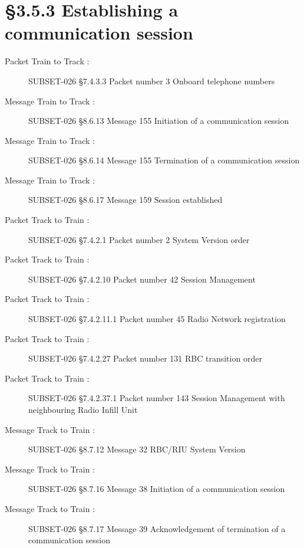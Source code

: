 \documentclass{template/openetcs_report}
\begin{document}
\section{\S3.5.3 Establishing a communication session}
\begin{description}
\item [Packet Train to Track :] SUBSET-026 \S7.4.3.3 Packet number 3	Onboard telephone numbers
\item [Message Train to Track :] SUBSET-026 \S8.6.13 Message 155 Initiation of a communication session
\item [Message Train to Track :] SUBSET-026 \S8.6.14 Message 155 Termination of a communication session
\item [Message Train to Track :] SUBSET-026 \S8.6.17	Message 159 Session established
\item [Packet Track to Train :] SUBSET-026 \S7.4.2.1  Packet number 2	System Version order
\item [Packet Track to Train :] SUBSET-026 \S7.4.2.10 Packet number 42	Session Management
\item [Packet Track to Train :] SUBSET-026 \S7.4.2.11.1 Packet number 45	Radio Network registration
\item [Packet Track to Train :] SUBSET-026 \S7.4.2.27 Packet number 131	RBC transition order
\item [Packet Track to Train :] SUBSET-026 \S7.4.2.37.1 Packet number 143	Session Management with neighbouring Radio Infill Unit
\item [Message Track to Train :] SUBSET-026 \S8.7.12	Message 32 RBC/RIU System Version
\item [Message Track to Train :] SUBSET-026 \S8.7.16	Message 38 Initiation of a communication session
\item [Message Track to Train :] SUBSET-026 \S8.7.17	Message 39 Acknowledgement of termination of a communication session
\end{description}
\end{document}

